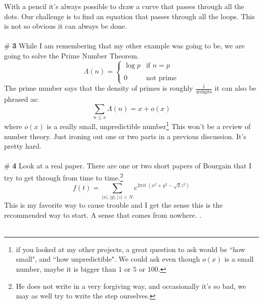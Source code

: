 \documentclass[12pt]{article}
\begin{document}
With a pencil it's always possible to draw a curve that passes through all the dots.
Our challenge is to find an equation that passes through all the loops.  This is not so obvious it can always be done. \\ \\
\# \textbf{3} While I am remembering that my other example was going to be, we are going to solve the Prime Number Theorem.  
$$ \Lambda(n) = \left\{ \begin{array}{cl} \log p & \text{if }n=p \\ \\
0 & \text{not prime}\end{array} \right. $$
The prime number says that the density of primes is roughly $ \frac{1}{\text{\# digits}} $ it can also be phrased as:
$$ \sum_{n \leq x} \Lambda(n)  = x + o(x) $$
where $o(x)$ is a really small, unpredictible number\footnote{if you looked at my other projects, a great question to ask would be ``how small", and ``how unpredictible".  We could ask even though $o(x)$ is a small number, maybe it is bigger than $1$ or $5$ or $100$.} This won't be a review of number theory.  Just ironing out one or two parts in a previous discussion.  It's pretty hard. \\ \\
\# \textbf{4} Look at a real paper.  There are one or two short papers of Bourgain that I try to get through from time to time.\footnote{He does not write in a very forgiving way, and occasionally it's so bad, we may as well try to write the step ourselves.}
$$ f(t) = \sum_{|x|, |y|, |z| < N} e^{2\pi i t \; (x^2 + y^2 - \sqrt{2} z^2)} $$ 
This is my favorite way to cause trouble and I get the sense this is the recommended way to start.  A sense that comes from nowhere. .
 \\ \\

\newpage
\end{document}
